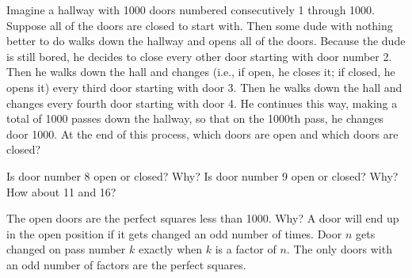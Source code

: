 
Imagine a hallway with 1000 doors numbered consecutively 1 through 1000.  Suppose all of the doors are closed to start with.  Then some dude with nothing better to do walks down the hallway and opens all of the doors.  Because the dude is still bored, he decides to close every other door starting with door number 2.  Then he walks down the hall and changes (i.e., if open, he closes it; if closed, he opens it) every third door starting with door 3.  Then he walks down the hall and changes every fourth door starting with door 4.  He continues this way, making a total of 1000 passes down the hallway, so that on the 1000th pass, he changes door 1000.  At the end of this process, which doors are open and which doors are closed? 

\begin{hint}
Is door number 8 open or closed?  Why?  Is door number 9 open or closed?  Why?  How about 11 and 16?
\end{hint}

\begin{solution}
The open doors are the perfect squares less than 1000.  Why?  A door will end up in the open position if it gets changed an odd number of times.  Door $n$ gets changed on pass number $k$ exactly when $k$ is a factor of $n$.  The only doors with an odd number of factors are the perfect squares.
\end{solution}